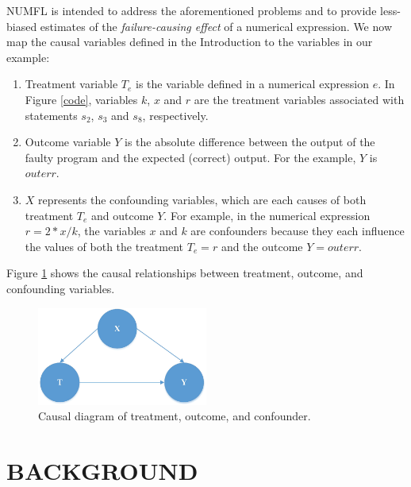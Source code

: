 NUMFL is intended to address the aforementioned problems and to provide less-biased estimates of the {\it failure-causing effect} of a numerical expression.  We now map the causal variables defined in the Introduction to the variables in our example:
\begin{enumerate}
\item 	Treatment variable $T_e$ is the variable defined in a numerical expression $e$.  In Figure \ref{code}, variables $k$, $x$ and $r$ are the treatment variables associated with statements $s_2$, $s_3$ and $s_8$, respectively.
	\item Outcome variable $Y$ is the absolute difference between the output of the faulty program and the expected (correct) output.  For the example, $Y$ is $outerr$.
\item $X$ represents the confounding variables, which are each causes of both treatment $T_e$ and outcome $Y$. For example, in the numerical expression $r=2*x/k$, the variables $x$ and $k$ are confounders because they each influence the values of both the treatment $T_e=r$ and the outcome $Y=outerr$.

\end{enumerate}

Figure \ref{dag1} shows the causal relationships between treatment, outcome, and confounding variables.
\begin{figure}[!thpb]
\centering
\includegraphics[width=0.5\textwidth]{CausalDAG1.eps}
\caption{Causal diagram of treatment, outcome, and confounder.}
\label{dag1}
\end{figure}


\section{BACKGROUND}\label{background}
